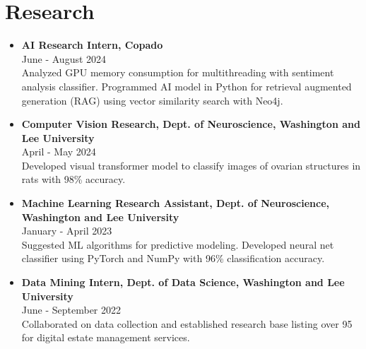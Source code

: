 \section*{Research}
\begin{itemize}[leftmargin=*]
    \item \textbf{AI Research Intern, Copado} \\
    June - August 2024 \\
    Analyzed GPU memory consumption for multithreading with sentiment analysis classifier. Programmed AI model in Python for retrieval augmented generation (RAG) using vector similarity search with Neo4j.

    \item \textbf{Computer Vision Research, Dept. of Neuroscience, Washington and Lee University} \\
    April - May 2024 \\
    Developed visual transformer model to classify images of ovarian structures in rats with 98\% accuracy.
        
    \item \textbf{Machine Learning Research Assistant, Dept. of Neuroscience, Washington and Lee University} \\
    January - April 2023 \\
    Suggested ML algorithms for predictive modeling. Developed neural net classifier using PyTorch and NumPy with 96\% classification accuracy.
        
    \item \textbf{Data Mining Intern, Dept. of Data Science, Washington and Lee University} \\
    June - September 2022 \\
    Collaborated on data collection and established research base listing over 95 for digital estate management services.
\end{itemize}